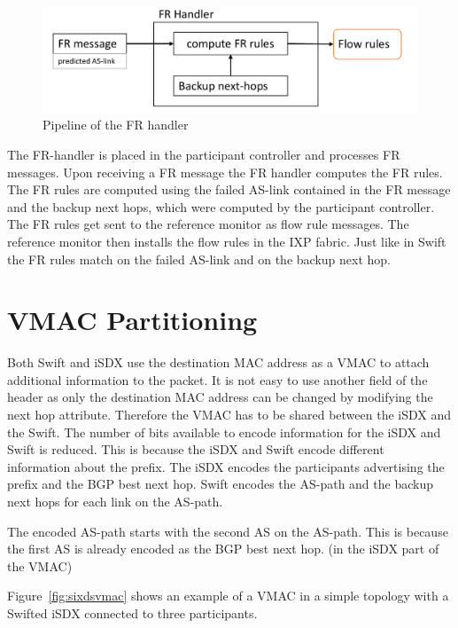 \begin{figure}[h]
\center
\includegraphics[scale = 0.6]{Figures/design_fr_handler_cropped.pdf}
\caption{Pipeline of the FR handler}
\end{figure}

The FR-handler is placed in the participant controller and processes FR messages.
Upon receiving a FR message the FR handler computes the FR rules. The FR rules are computed using the failed AS-link contained in the FR message and the backup next hops, which were computed by the participant controller. 
The FR rules get sent to the reference monitor as flow rule messages. The reference monitor then installs the flow rules in the IXP fabric. Just like in Swift the FR rules match on the failed AS-link and on the backup next hop.    

\newpage

\section{\label{chapter4:vmac_partitioning}VMAC Partitioning}

Both Swift and iSDX use the destination MAC address as a VMAC to attach additional information to the packet. It is not easy to use another field of the header as only the destination MAC address can be changed by modifying the next hop attribute. Therefore the VMAC has to be shared between the iSDX and the Swift. The number of bits available to encode information for the iSDX and Swift is reduced. This is because the iSDX and Swift encode different \\information about the prefix. The iSDX encodes the participants advertising the prefix and the BGP best next hop. Swift encodes the AS-path and the backup next hops for each link on the AS-path.

The encoded AS-path starts with the second AS on the AS-path. This is because the first AS is already encoded as the BGP best next hop. (in the iSDX part of the VMAC)

Figure~\ref{fig:sixdsvmac} shows an example of a VMAC in a simple topology with a Swifted iSDX connected to three participants. 

